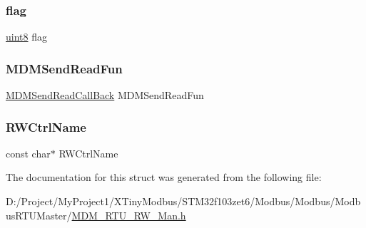 \subsubsection{\texorpdfstring{flag}{flag}}
{\footnotesize\ttfamily \mbox{\hyperlink{_m_d___r_t_u___type_8h_adde6aaee8457bee49c2a92621fe22b79}{uint8}} flag}

\mbox{\label{struct_p_m_d_m___r_w___ctrl_ad3d538957e6a992754603cc331a3b623}} 
\subsubsection{\texorpdfstring{M\+D\+M\+Send\+Read\+Fun}{MDMSendReadFun}}
{\footnotesize\ttfamily \mbox{\hyperlink{_m_d_m___r_t_u___r_w___man_8h_a0ffbd8a7b888621e7e03c1036f07a879}{M\+D\+M\+Send\+Read\+Call\+Back}} M\+D\+M\+Send\+Read\+Fun}

\mbox{\label{struct_p_m_d_m___r_w___ctrl_a0cce05c85a67cd1dc05fe7fe11382941}} 
\subsubsection{\texorpdfstring{R\+W\+Ctrl\+Name}{RWCtrlName}}
{\footnotesize\ttfamily const char$\ast$ R\+W\+Ctrl\+Name}



The documentation for this struct was generated from the following file\+:\begin{DoxyCompactItemize}
\item 
D\+:/\+Project/\+My\+Project1/\+X\+Tiny\+Modbus/\+S\+T\+M32f103zet6/\+Modbus/\+Modbus/\+Modbus\+R\+T\+U\+Master/\mbox{\hyperlink{_m_d_m___r_t_u___r_w___man_8h}{M\+D\+M\+\_\+\+R\+T\+U\+\_\+\+R\+W\+\_\+\+Man.\+h}}\end{DoxyCompactItemize}
